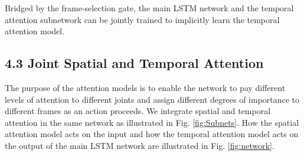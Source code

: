 \documentclass[letterpaper]{article}
\begin{document}
Bridged by the frame-selection gate, the main LSTM network and the temporal attention subnetwork can be jointly trained to implicitly learn the temporal attention model.
\begin{comment}
\begin{equation}
\label{equ:tem_att}
  \beta_t = \text{PReLU}(\mathbf{X}_t, \mathbf{h}_{t-1}, \Theta_t),
\end{equation}
where $\beta_t$ is a scalar whose value reflects the temporal attention weights, depending on the current input and hidden state from the last time step, $\Theta_t$ represents the parameters of PReLU \cite {he2015delving} jointly trained in the whole network.

For a video sequence, with the temporal attention assigned on each frame, we fuse all the hidden states across temporal domain \cite{CVPR15HRNN,zhu2015co} to summarize the relevant information and predict the final class label. Concretely, the hidden layer is then feed into a fully connected layer, whose outputs are accumulated with different temporal attention weights to get the probability that a sequence $X$ belongs to the class $C_k$:
\begin{equation}
\label{equ:pred}
  p\left( C_k | \bm{X} \right) = \frac{e^{o_k}}{\sum_{i=1}^C e^{o_i}},~~k = 1,..., C,
\end{equation}

\begin{equation}
\label{equ:ot}
  \bm{o} = \sum_{t=1}^{T}{\beta_t}\cdot(\bm{W}_{ho}\bm{h}_t + b_o),
\end{equation}
where $\bm{o} = [o_1, o_2, ..., o_C]$, and the labeling indicating different class types is denoted by $C_k$, $T$ represents the length of the video sequence, $h_t$ indicates the hidden state of the top layer of the LSTM network.
\end{comment}

\subsection{4.3 Joint Spatial and Temporal Attention}

The purpose of the attention models is to enable the network to pay different levels of attention to different joints and assign different degrees of importance to different frames as an action proceeds. We integrate spatial and temporal attention in the same network as illustrated in Fig. \ref{fig:Subnets}. How the spatial attention model acts on the input and how the temporal attention model acts on the output of the main LSTM network are illustrated in Fig. \ref{fig:network}.
\end{document}
